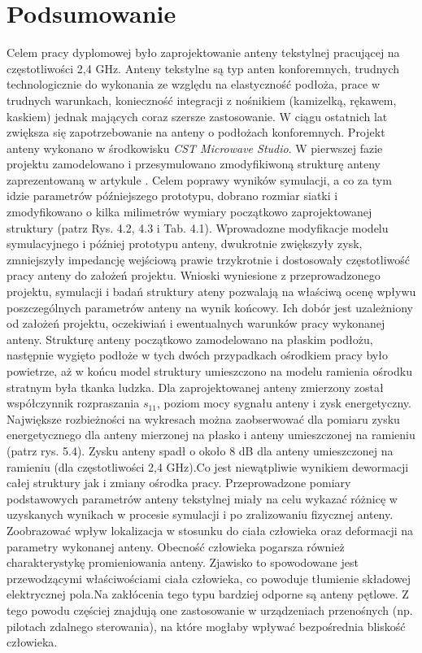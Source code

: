  


\chapter{Podsumowanie}

Celem pracy dyplomowej było zaprojektowanie anteny tekstylnej pracującej na częstotliwości 2,4 GHz. Anteny tekstylne są typ anten konforemnych, trudnych technologicznie do wykonania ze względu na elastyczność podłoża, prace w trudnych warunkach, konieczność integracji z nośnikiem (kamizelką, rękawem, kaskiem) jednak mających coraz szersze zastosowanie. W ciągu ostatnich lat zwiększa się zapotrzebowanie na anteny o podłożach konforemnych. 
Projekt anteny wykonano w środkowisku \emph{CST Microwave Studio}. W pierwszej fazie projektu zamodelowano i przesymulowano zmodyfikiwoną strukturę anteny zaprezentowaną w artykule \cite{Artykul}. Celem poprawy wyników symulacji, a co za tym idzie parametrów późniejszego prototypu, dobrano rozmiar siatki i zmodyfikowano o kilka milimetrów wymiary początkowo zaprojektowanej struktury (patrz Rys. 4.2, 4.3 i Tab. 4.1). Wprowadozne modyfikacje modelu symulacyjnego i później prototypu anteny, dwukrotnie zwiększyły zysk, zmniejszyły impedancję wejściową prawie trzykrotnie i dostosowały częstotliwość pracy anteny do założeń projektu. Wnioski wyniesione z przeprowadzonego projektu, symulacji i badań struktury ateny pozwalają na właściwą ocenę wpływu poszczególnych parametrów anteny na wynik końcowy. Ich dobór jest uzależniony od założeń projektu, oczekiwiań i ewentualnych warunków pracy wykonanej anteny. 
Strukturę anteny początkowo zamodelowano na płaskim podłożu, następnie wygięto podłoże w tych dwóch przypadkach ośrodkiem pracy było powietrze, aż w końcu model struktury umieszczono na modelu ramienia ośrodku stratnym była tkanka ludzka.    
Dla zaprojektowanej anteny zmierzony został współczynnik rozpraszania $s_{11}$, poziom mocy sygnału anteny i zysk energetyczny. Największe rozbieżności na wykresach można zaobserwować dla pomiaru zysku energetycznego dla anteny mierzonej na płasko i anteny umieszczonej na ramieniu (patrz rys. 5.4). Zysku anteny spadł o około 8 dB dla anteny umieszczonej na ramieniu (dla częstotliwości 2,4 GHz).Co jest niewątpliwie wynikiem dewormacji całej struktury jak i zmiany ośrodka pracy. 
Przeprowadzone pomiary podstawowych parametrów anteny tekstylnej miały na celu wykazać różnicę w uzyskanych wynikach w procesie symulacji i po zralizowaniu fizycznej anteny. Zoobrazować wpływ lokalizacja w stosunku do ciała człowieka oraz deformacji na parametry wykonanej anteny. Obecność człowieka pogarsza również charakterystykę promieniowania anteny. Zjawisko to spowodowane jest przewodzącymi właściwościami ciała człowieka, co powoduje tłumienie składowej elektrycznej pola.Na zakłócenia tego typu bardziej odporne są anteny pętlowe. Z tego powodu częściej znajdują one zastosowanie w urządzeniach przenośnych (np. pilotach zdalnego sterowania), na które mogłaby wpływać bezpośrednia bliskość człowieka. 
